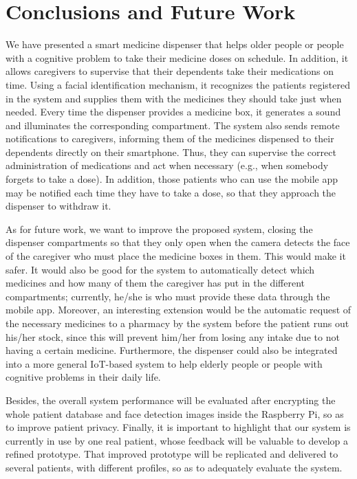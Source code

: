 \documentclass{IOS-Book-Article}
\begin{document}
\section{Conclusions and Future Work}

We have presented a smart medicine dispenser that helps older people or people with a cognitive problem to take their medicine doses on schedule. In addition, it allows caregivers to supervise that their dependents take their medications on time. Using a facial identification mechanism, it recognizes the patients registered in the system and supplies them with the medicines they should take just when needed. Every time the dispenser provides a medicine box, it generates a sound and illuminates the corresponding compartment. The system also sends remote notifications to caregivers, informing them of the medicines dispensed to their dependents directly on their smartphone. Thus, they can supervise the correct administration of medications and act when necessary (e.g., when somebody forgets to take a dose). In addition, those patients who can use the mobile app may be notified each time they have to take a dose, so that they approach the dispenser to withdraw it.

As for future work, we want to improve the proposed system, closing the dispenser compartments so that they only open when the camera detects the face of the caregiver who must place the medicine boxes in them. This would make it safer. It would also be good for the system to automatically detect which medicines and how many of them the caregiver has put in the different compartments; currently, he/she is who must provide these data through the mobile app. Moreover, an interesting extension would be the automatic request of the necessary medicines to a pharmacy by the system before the patient runs out his/her stock, since this will prevent him/her from losing any intake due to not having a certain medicine. Furthermore, the dispenser could also be integrated into a more general IoT-based system to help elderly people or people with cognitive problems in their daily life.

Besides, the overall system performance will be evaluated after encrypting the whole patient database and face detection images inside the Raspberry Pi, so as to improve patient privacy. Finally, it is important to highlight that our system is currently in use by one real patient, whose feedback will be valuable to develop a refined prototype. That improved prototype will be replicated and delivered to several patients, with different profiles, so as to adequately evaluate the system.
\end{document}

